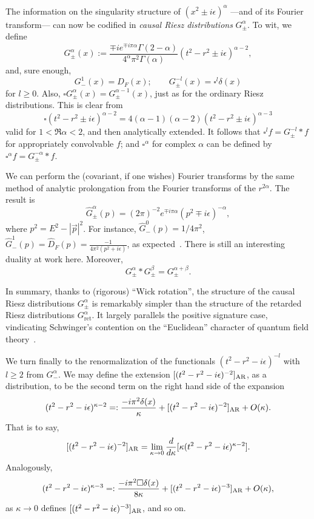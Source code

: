 \documentclass[a4paper,12pt]{article}
\renewcommand{\a}{\alpha}          %
\renewcommand{\b}{\beta}           %
\newcommand{\dl}{\delta}           %
\newcommand{\eps}{\epsilon}        %
\newcommand{\Ga}{\Gamma}           %
\newcommand{\ret}{{\mathrm{ret}}}  %
\newcommand{\7}{\dagger}           %
\theoremstyle{plain}
\theoremstyle{definition}
\begin{document}
The information on the singularity structure of $(x^2\pm i\eps)^{\a}$
---and of its Fourier transform--- can now be codified in
\textit{causal Riesz distributions} $G^\a_{\pm}$. To wit, we define
\begin{equation}
G^\a_{\pm}(x) :=
\frac{\mp ie^{\mp i\pi\a}\Ga(2-\a)}{4^\a\pi^2\Ga(\a)}
(t^2-r^2\pm i\eps)^{\a-2},
\label{eq:causalRiesz}
\end{equation}
and, sure enough,
$$
G^1_{-}(x) = D_F(x); \qquad G^{-l}_{\pm}(x) = \square^l\dl(x)
$$
for $l\geq0$. Also, $\square G^\a_{\pm}(x) = G^{\a-1}_{\pm}(x)$, just
as for the ordinary Riesz distributions. This is clear from
$$
\square(t^2-r^2\pm i\eps)^{\a-2} =
4(\a-1)(\a-2)(t^2-r^2\pm i\eps)^{\a-3}
$$
valid for $1<\Re\a<2$, and then analytically extended. It follows that
$\square^l f = G^{-l}_{\pm} * f$ for appropriately convolvable $f$; and
$\square^\a$ for complex $\a$ can be defined by
$\square^\a f = G^{-\a}_{\pm}*f$.

We can perform the (covariant, if one wishes) Fourier transforms by
the same method of analytic prolongation from the Fourier transforms
of the $r^{2\a}$. The result is
\begin{equation}
\hat G^\a_\pm(p) = (2\pi)^{-2}e^{\mp i\pi\a}(p^2\mp i\eps)^{-\a},
\label{eq:Fourier-two}
\end{equation}
where $p^2 = E^2 - |\vec p|^2$. For instance,
$\hat G^0_-(p) = 1/4\pi^2$,
$\hat G^1_-(p) = \hat D_F(p) = \frac{-1}{4\pi^2(p^2+i\eps)}$, as
expected~\cite{IZ}. There is still an
interesting duality at work here. Moreover,
$$
G^\a_{\pm} * G^\b_{\pm} = G^{\a+\b}_{\pm}.
$$

In summary, thanks to (rigorous) ``Wick rotation'', the structure of
the causal Riesz distributions $G^\a_{\pm}$ is remarkably simpler than
the structure of the retarded Riesz distributions $G^\a_{\ret}$. It
largely parallels the positive signature case, vindicating Schwinger's
contention on the ``Euclidean'' character of quantum field
theory~\cite{JulianS}.

\smallskip

We turn finally to the renormalization of the functionals
$(t^2-r^2 - i\eps)^{-l}$ with $l\geq2$ from $G^\a_-$. We may define
the extension $[(t^2-r^2 - i\eps)^{-2}]_{\rm AR}$, as a distribution,
to be the second term on the right hand side of the expansion
$$
(t^2-r^2-i\eps)^{\kappa-2} =: \frac{-i\pi^2\dl(x)}{\kappa} +
[(t^2-r^2 - i\eps)^{-2}]_{\rm AR} + O(\kappa).
$$
That is to say,
$$
[(t^2-r^2 - i\eps)^{-2}]_{\rm AR} = \lim_{\kappa\to 0}
\frac{d}{d\kappa} [\kappa(t^2-r^2-i\eps)^{\kappa-2}].
$$
Analogously,
\begin{equation}
(t^2-r^2-i\eps)^{\kappa-3} =: \frac{-i\pi^2\square\dl(x)}{8\kappa} +
[(t^2-r^2 - i\eps)^{-3}]_{\rm AR} + O(\kappa),
\label{eq:high-pole}
\end{equation}
as $\kappa\to 0$ defines $[(t^2-r^2 - i\eps)^{-3}]_{\rm AR}$,
and so on.
\end{document}
